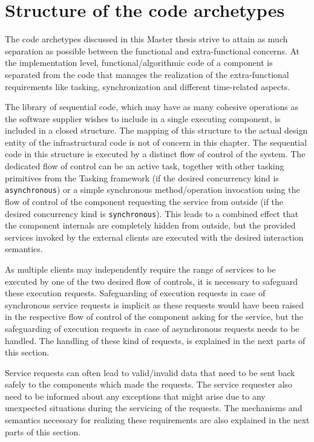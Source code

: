 \section{Structure of the code archetypes}
The code archetypes discussed in this Master thesis strive to attain as much separation as possible between the functional and extra-functional concerns. At the implementation level, functional/algorithmic code of a component is separated from the code that manages the realization of the extra-functional requirements like tasking, synchronization and different time-related aspects.

The library of sequential code, which may have as many cohesive operations as the software supplier wishes to include in a single executing component, is included in a closed structure. The mapping of this structure to the actual design entity of the infrastructural code is not of concern in this chapter. The sequential code in this structure is executed by a distinct flow of control of the system. The dedicated flow of control can be an active task, together with other tasking primitives from the Tasking framework (if the desired concurrency kind is \texttt{asynchronous}) or a simple synchronous method/operation invocation using the flow of control of the component requesting the service from outside (if the desired concurrency kind is \texttt{synchronous}). This leads to a combined effect that the component internals are completely hidden from outside, but the provided services invoked by the external clients are executed with the desired interaction semantics.

As multiple clients may independently require the range of services to be executed by one of the two desired flow of controls, it is necessary to safeguard these execution requests. Safeguarding of execution requests in case of synchronous service requests is implicit as these requests would have been raised in the respective flow of control of the component asking for the service, but the safeguarding of execution requests in case of asynchronous requests needs to be handled. The handling of these kind of requests, is explained in the next parts of this section.

Service requests can often lead to valid/invalid data that need to be sent back safely to the components which made the requests. The service requester also need to be informed about any exceptions that might arise due to any unexpected situations during the servicing of the requests. The mechanisms and semantics necessary for realizing these requirements are also explained in the next parts of this section. 

